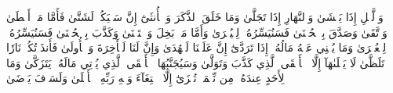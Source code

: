 وَٱلَّيۡلِ إِذَا يَغۡشَىٰ
وَٱلنَّهَارِ إِذَا تَجَلَّىٰ
وَمَا خَلَقَ ٱلذَّكَرَ وَٱلۡأُنثَىٰٓ
إِنَّ سَعۡيَكُمۡ لَشَتَّىٰ
فَأَمَّا مَنۡ أَعۡطَىٰ وَٱتَّقَىٰ
وَصَدَّقَ بِٱلۡحُسۡنَىٰ
فَسَنُيَسِّرُهُۥ لِلۡيُسۡرَىٰ
وَأَمَّا مَنۢ بَخِلَ وَٱسۡتَغۡنَىٰ
وَكَذَّبَ بِٱلۡحُسۡنَىٰ
فَسَنُيَسِّرُهُۥ لِلۡعُسۡرَىٰ
وَمَا يُغۡنِي عَنۡهُ مَالُهُۥٓ إِذَا تَرَدَّىٰٓ
إِنَّ عَلَيۡنَا لَلۡهُدَىٰ
وَإِنَّ لَنَا لَلۡأٓخِرَةَ وَٱلۡأُولَىٰ
فَأَنذَرۡتُكُمۡ نَارٗا تَلَظَّىٰ
لَا يَصۡلَىٰهَآ إِلَّا ٱلۡأَشۡقَى
ٱلَّذِي كَذَّبَ وَتَوَلَّىٰ
وَسَيُجَنَّبُهَا ٱلۡأَتۡقَى
ٱلَّذِي يُؤۡتِي مَالَهُۥ يَتَزَكَّىٰ
وَمَا لِأَحَدٍ عِندَهُۥ مِن نِّعۡمَةٖ تُجۡزَىٰٓ
إِلَّا ٱبۡتِغَآءَ وَجۡهِ رَبِّهِ ٱلۡأَعۡلَىٰ
وَلَسَوۡفَ يَرۡضَىٰ